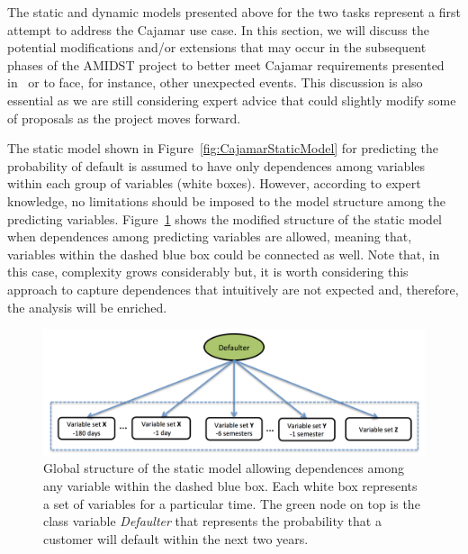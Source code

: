 
The static and dynamic models presented above for the two tasks represent a first attempt to address the Cajamar use case. In this section, we will discuss the potential modifications and/or extensions that may occur in the subsequent phases of the AMIDST project to better meet Cajamar requirements presented in~\cite{Fer14b} or to face, for instance, other unexpected events. This discussion is also essential as we are still considering expert advice that could slightly modify some of proposals as the project moves forward.

The static model shown in Figure~\ref{fig:CajamarStaticModel} for predicting the probability of default is assumed to have only dependences among variables within each group of variables (white boxes). However, according to expert knowledge, no limitations should be imposed to the model structure among the predicting variables. Figure~\ref{fig:staticDependences} shows the modified structure of the static model when dependences among predicting variables are allowed, meaning that, variables within the dashed blue box could be connected as well. Note that, in this case, complexity grows considerably but, it is worth considering this approach to capture dependences that intuitively are not expected and, therefore, the analysis will be enriched.

\begin{figure}[ht!]
  \centering
\includegraphics[scale=0.4]{./figures/CajaMarModel3}
\caption{\label{fig:staticDependences}Global structure of the static model allowing dependences among any variable within the dashed blue box. Each white box represents a set of variables for a particular time. The green node on top is the class variable \emph{Defaulter} that represents the probability that a customer will default within the next two years.} 
\end{figure}

